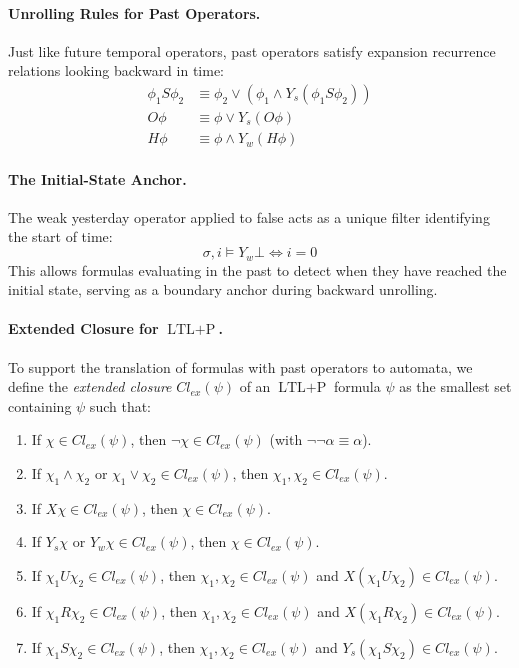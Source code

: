 \paragraph{Unrolling Rules for Past Operators.}
Just like future temporal operators, past operators satisfy expansion recurrence relations looking backward in time:
\begin{align*}
  \phi_1 S \phi_2 &\equiv \phi_2 \lor (\phi_1 \land Y_s(\phi_1 S \phi_2)) \\
  O \phi &\equiv \phi \lor Y_s(O \phi) \\
  H \phi &\equiv \phi \land Y_w(H \phi)
\end{align*}

\paragraph{The Initial-State Anchor.}
The weak yesterday operator applied to false acts as a unique filter identifying the start of time:
\[
  \sigma, i \models Y_w \bot \iff i = 0
\]
This allows formulas evaluating in the past to detect when they have reached the initial state, serving as a boundary anchor during backward unrolling.

\paragraph{Extended Closure for $\text{LTL}+\text{P}$.}
To support the translation of formulas with past operators to automata, we define the \emph{extended closure} $Cl_{ex}(\psi)$ of an $\text{LTL}+\text{P}$ formula $\psi$ as the smallest set containing $\psi$ such that:
\begin{enumerate}
    \item If $\chi \in Cl_{ex}(\psi)$, then $\neg\chi \in Cl_{ex}(\psi)$ (with $\neg\neg\alpha \equiv \alpha$).
    \item If $\chi_1 \land \chi_2$ or $\chi_1 \lor \chi_2 \in Cl_{ex}(\psi)$, then $\chi_1, \chi_2 \in Cl_{ex}(\psi)$.
    \item If $X \chi \in Cl_{ex}(\psi)$, then $\chi \in Cl_{ex}(\psi)$.
    \item If $Y_s \chi$ or $Y_w \chi \in Cl_{ex}(\psi)$, then $\chi \in Cl_{ex}(\psi)$.
    \item If $\chi_1 U \chi_2 \in Cl_{ex}(\psi)$, then $\chi_1, \chi_2 \in Cl_{ex}(\psi)$ and $X(\chi_1 U \chi_2) \in Cl_{ex}(\psi)$.
    \item If $\chi_1 R \chi_2 \in Cl_{ex}(\psi)$, then $\chi_1, \chi_2 \in Cl_{ex}(\psi)$ and $X(\chi_1 R \chi_2) \in Cl_{ex}(\psi)$.
    \item If $\chi_1 S \chi_2 \in Cl_{ex}(\psi)$, then $\chi_1, \chi_2 \in Cl_{ex}(\psi)$ and $Y_s(\chi_1 S \chi_2) \in Cl_{ex}(\psi)$.
\end{enumerate}

